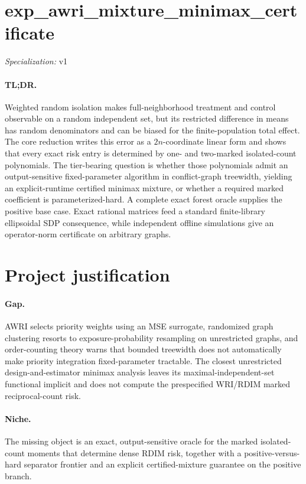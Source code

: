 \documentclass{article}
\begin{document}
\sloppy

\section*{exp\_\allowbreak{}awri\_\allowbreak{}mixture\_\allowbreak{}minimax\_\allowbreak{}certificate}

\noindent\textit{Specialization:} v1\par

\paragraph{TL;DR.} Weighted random isolation makes full-neighborhood treatment and control observable on a random independent set, but its restricted difference in means has random denominators and can be biased for the finite-population total effect. The core reduction writes this error as a \(2n\)-coordinate linear form and shows that every exact risk entry is determined by one- and two-marked isolated-count polynomials. The tier-bearing question is whether those polynomials admit an output-sensitive fixed-parameter algorithm in conflict-graph treewidth, yielding an explicit-runtime certified minimax mixture, or whether a required marked coefficient is parameterized-hard. A complete exact forest oracle supplies the positive base case. Exact rational matrices feed a standard finite-library ellipsoidal SDP consequence, while independent offline simulations give an operator-norm certificate on arbitrary graphs.

\section{Project justification}

\paragraph{Gap.} AWRI selects priority weights using an MSE surrogate, randomized graph clustering resorts to exposure-probability resampling on unrestricted graphs, and order-counting theory warns that bounded treewidth does not automatically make priority integration fixed-parameter tractable. The closest unrestricted design-and-estimator minimax analysis leaves its maximal-independent-set functional implicit and does not compute the prespecified WRI/RDIM marked reciprocal-count risk.

\paragraph{Niche.} The missing object is an exact, output-sensitive oracle for the marked isolated-count moments that determine dense RDIM risk, together with a positive-versus-hard separator frontier and an explicit certified-mixture guarantee on the positive branch.
\end{document}
